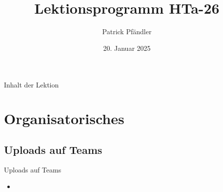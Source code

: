 





\title{\textbf{Lektionsprogramm HTa-26}}
\author{Patrick Pfändler}
\date{20. Januar 2025}




\frame{\titlepage}

\begin{frame}{Inhalt der Lektion}
	\tableofcontents
\end{frame}











%
%



\section{Organisatorisches}
\BlueSectionSlide

\subsection{Uploads auf Teams}
\begin{frame}{Uploads auf Teams}
	\begin{itemize}
		\item[\textbullet] 
	\end{itemize}

\end{frame}








